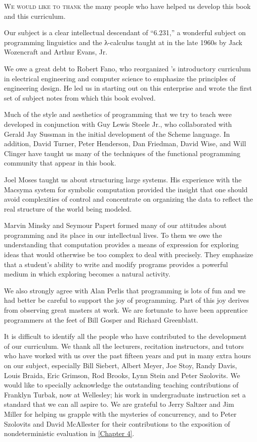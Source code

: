 \label{Acknowledgments}

\lettrine[findent=1pt]{W}{e would like to thank} the many people who have helped us develop this book and this curriculum.

Our subject is a clear intellectual descendant of “6.231,” a wonderful subject on programming linguistics and the λ-calculus taught at  in the late 1960s by Jack Wozencraft and Arthur Evans, Jr.

We owe a great debt to Robert Fano, who reorganized ’s introductory curriculum in electrical engineering and computer science to emphasize the principles of engineering design.
He led us in starting out on this enterprise and wrote the first set of subject notes from which this book evolved.

Much of the style and aesthetics of programming that we try to teach were developed in conjunction with Guy Lewis Steele Jr., who collaborated with Gerald Jay Sussman in the initial development of the Scheme language.
In addition, David Turner, Peter Henderson, Dan Friedman, David Wise, and Will Clinger have taught us many of the techniques of the functional programming community that appear in this book.

Joel Moses taught us about structuring large systems.
His experience with the Macsyma system for symbolic computation provided the insight that one should avoid complexities of control and concentrate on organizing the data to reflect the real structure of the world being modeled.

Marvin Minsky and Seymour Papert formed many of our attitudes about programming and its place in our intellectual lives.
To them we owe the understanding that computation provides a means of expression for exploring ideas that would otherwise be too complex to deal with precisely.
They emphasize that a student’s ability to write and modify programs provides a powerful medium in which exploring becomes a natural activity.

We also strongly agree with Alan Perlis that programming is lots of fun and we had better be careful to support the joy of programming.
Part of this joy derives from observing great masters at work.
We are fortunate to have been apprentice programmers at the feet of Bill Gosper and Richard Greenblatt.

It is difficult to identify all the people who have contributed to the development of our curriculum.
We thank all the lecturers, recitation instructors, and tutors who have worked with us over the past fifteen years and put in many extra hours on our subject, especially Bill Siebert, Albert Meyer, Joe Stoy, Randy Davis, Louis Braida, Eric Grimson, Rod Brooks, Lynn Stein and Peter Szolovits.
We would like to specially acknowledge the outstanding teaching contributions of Franklyn Turbak, now at Wellesley;
his work in undergraduate instruction set a standard that we can all aspire to.
We are grateful to Jerry Saltzer and Jim Miller for helping us grapple with the mysteries of concurrency, and to Peter Szolovits and David McAllester for their contributions to the exposition of nondeterministic evaluation in \cref{Chapter 4}.

